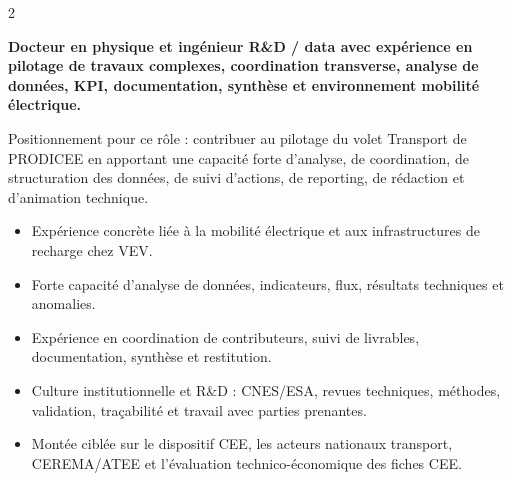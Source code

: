 \documentclass[8pt,a4paper,ragged2e,withhyper]{altacv}
\begin{document}
\begin{paracol}{2}
\switchcolumn


\textbf{Docteur en physique et ingénieur R\&D / data avec expérience en pilotage de travaux complexes, coordination transverse, analyse de données, KPI, documentation, synthèse et environnement mobilité électrique.}

Positionnement pour ce rôle : contribuer au pilotage du volet Transport de PRODICEE en apportant une capacité forte d’analyse, de coordination, de structuration des données, de suivi d’actions, de reporting, de rédaction et d’animation technique.

\begin{itemize}
  \item Expérience concrète liée à la mobilité électrique et aux infrastructures de recharge chez VEV.
  \item Forte capacité d’analyse de données, indicateurs, flux, résultats techniques et anomalies.
  \item Expérience en coordination de contributeurs, suivi de livrables, documentation, synthèse et restitution.
  \item Culture institutionnelle et R\&D : CNES/ESA, revues techniques, méthodes, validation, traçabilité et travail avec parties prenantes.
  \item Montée ciblée sur le dispositif CEE, les acteurs nationaux transport, CEREMA/ATEE et l’évaluation technico-économique des fiches CEE.
\end{itemize}


\divider
{}
\divider

\medskip



\divider


\divider


\divider



\end{paracol}
\end{document}
